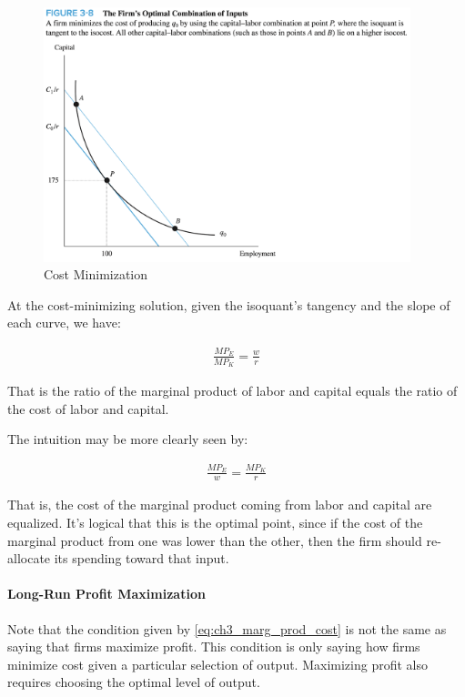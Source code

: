 \begin{figure}[!htb]
    \centering
        \includegraphics[width=0.95\textwidth]{../input/ch_3p3_cost_min.png}
    \caption{Cost Minimization}
    \label{fig:ch_3p3_cost_min}
\end{figure}

\FloatBarrier

At the cost-minimizing solution, given the isoquant's tangency and 
the slope of each curve,
we have:

\begin{align}
    \frac{M P_E}{M P_K}=\frac{w}{r}
\end{align}

That is the ratio of the marginal product of 
labor and capital equals the ratio of 
the cost of labor and capital.

The intuition may be more clearly seen by:

\begin{align}
    \frac{M P_E}{w}=\frac{M P_K}{r} \label{eq:ch3_marg_prod_cost}
\end{align}

That is, the cost of the marginal product 
coming from labor and capital are equalized.
It's logical that this is the optimal point, since if 
the cost of the marginal product from one was 
lower than the other, then the firm should re-allocate
its spending toward that input.

\paragraph{Long-Run Profit Maximization}

Note that the condition given by \eqref{eq:ch3_marg_prod_cost} 
is not the same as 
saying that firms maximize profit.
This condition is only saying how firms 
minimize cost given a particular selection of output.
Maximizing profit also requires choosing the optimal
level of output.

